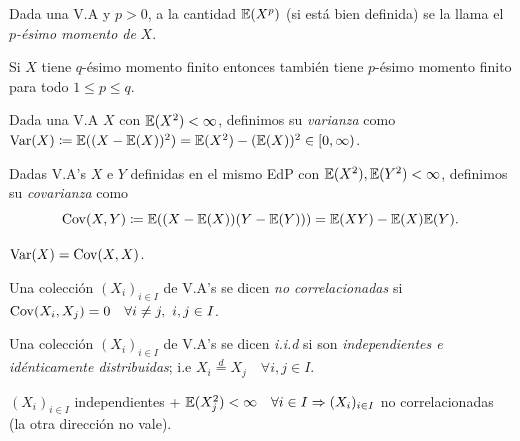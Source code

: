 \begin{definition}
	Dada una V.A y $p > 0$, a la cantidad $\mathbb{E}(X^{p})$ (si está bien definida) se la llama el \textit{$p$-ésimo momento de} $X$.
\end{definition}

\begin{observe}
	Si $X$ tiene $q$-ésimo momento finito entonces también tiene $p$-ésimo momento finito para todo $1 \leq p \leq q$.
\end{observe}

\begin{definition}
	Dada una V.A $X$ con $\mathbb{E}(X^{2}) < \infty$, definimos su \textit{varianza} como $\operatorname{Var}(X) \coloneq \mathbb{E}((X - \mathbb{E}(X))^{2}) = \mathbb{E}(X^{2}) - (\mathbb{E}(X))^{2} \in [0, \infty)$.
\end{definition}

\begin{definition}
	Dadas V.A's $X$ e $Y$ definidas en el mismo EdP con $\mathbb{E}(X^{2}), \mathbb{E}(Y^{2}) < \infty$, definimos su \textit{covarianza} como 
	\[ \operatorname{Cov}(X,Y) \coloneq \mathbb{E}((X - \mathbb{E}(X))(Y - \mathbb{E}(Y))) = \mathbb{E}(XY) - \mathbb{E}(X) \mathbb{E}(Y). \]
\end{definition}

\begin{note}
	$\operatorname{Var}(X) = \operatorname{Cov}(X,X)$.
\end{note}

\begin{definition}
	Una colección $(X_{i})_{i \in I}$ de V.A's se dicen \textit{no correlacionadas} si $\operatorname{Cov}(X_{i}, X_{j}) = 0 \quad \forall i \neq j,\ i,j \in I$.
\end{definition}

\begin{definition}
	Una colección $(X_{i})_{i \in I}$ de V.A's se dicen \textit{i.i.d} si son \textit{independientes e idénticamente distribuidas}; i.e $X_{i} \stackrel{d}{=} X_{j} \quad \forall i,j \in I$.
\end{definition}

\begin{observe}
	$(X_{i})_{i \in I}$ independientes + $\mathbb{E}(X_{j}^{2}) < \infty \quad \forall i \in I \Rightarrow (X_{i})_{i \in I}$ no correlacionadas (la otra dirección no vale).
\end{observe}
